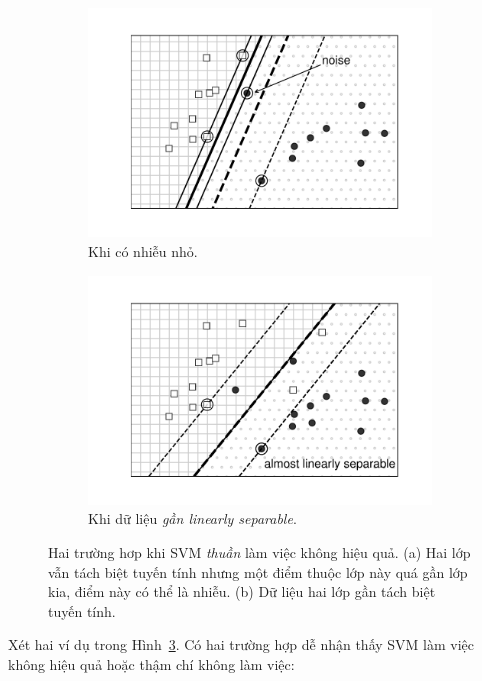 \begin{figure}[t]
    \begin{subfigure}{0.46\textwidth}
    \includegraphics[width=0.95\linewidth]{ebookML_src/src/softmargin_svm/ssvm1.pdf}
    \caption{Khi có nhiễu nhỏ.}
    \label{fig:20_1a}
    \end{subfigure}
    \begin{subfigure}{0.48\textwidth}
    \includegraphics[width=0.95\linewidth]{ebookML_src/src/softmargin_svm/ssvm2.pdf}
    \caption{Khi dữ liệu \textit{gần linearly separable}.}
    \label{fig:20_1b}
    \end{subfigure}
    \caption{Hai trường hơp khi SVM \textit{thuần} làm việc không hiệu quả. (a) Hai lớp vẫn tách biệt tuyến tính nhưng một điểm thuộc lớp này quá gần lớp kia, điểm này có thể là nhiễu. (b) Dữ liệu hai lớp gần tách biệt tuyến tính.}
    \label{fig:20_1}
\end{figure}


Xét hai ví dụ trong Hình~\ref{fig:20_1}. Có hai trường hợp dễ nhận thấy SVM làm
việc không hiệu quả hoặc thậm chí không làm việc: 

